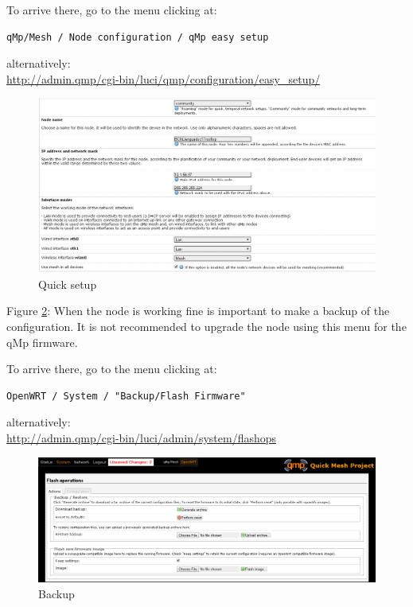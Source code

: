 \documentclass[11pt]{article}
\begin{document}
\noindent
To arrive there, go to the menu clicking at:
\begin{verbatim}
qMp/Mesh / Node configuration / qMp easy setup
\end{verbatim}
alternatively:\\
\url{http://admin.qmp/cgi-bin/luci/qmp/configuration/easy_setup/}

\begin{figure}[htb]
\centering
\includegraphics[width=.9\linewidth]{./img/qMp-basics-scrot/quick_setup.png}
\caption{\label{fig:quick-setup}Quick setup}
\end{figure}

Figure \ref{fig:backup}: When the node is working fine is important to make
a backup of the configuration. It is not recommended to upgrade the
node using this menu for the qMp firmware.

\noindent
To arrive there, go to the menu clicking at:
\begin{verbatim}
OpenWRT / System / "Backup/Flash Firmware"
\end{verbatim}
alternatively:\\
\url{http://admin.qmp/cgi-bin/luci/admin/system/flashops}

\begin{figure}[htb]
\centering
\includegraphics[width=.9\linewidth]{./img/qMp-basics-scrot/backup-new-firmware.png}
\caption{\label{fig:backup}Backup}
\end{figure}
\end{document}

